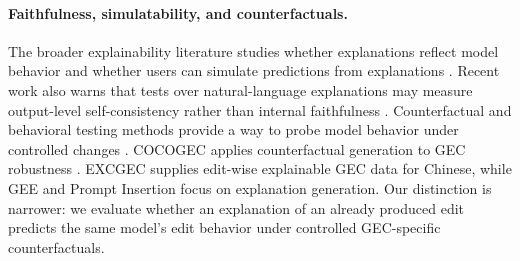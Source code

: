\paragraph{Faithfulness, simulatability, and counterfactuals.}
The broader explainability literature studies whether explanations reflect model behavior and whether users can simulate predictions from explanations \cite{hase-bansal-2020-evaluating,jacovi-goldberg-2020-towards,lyu-etal-2024-towards}. Recent work also warns that tests over natural-language explanations may measure output-level self-consistency rather than internal faithfulness \cite{parcalabescu-frank-2024-measuring}. Counterfactual and behavioral testing methods provide a way to probe model behavior under controlled changes \cite{ribeiro-etal-2020-beyond,gardner-etal-2020-evaluating,wu-etal-2021-polyjuice}. COCOGEC applies counterfactual generation to GEC robustness \cite{wang-etal-2026-cocogec}. EXCGEC supplies edit-wise explainable GEC data for Chinese, while GEE and Prompt Insertion focus on explanation generation. Our distinction is narrower: we evaluate whether an explanation of an already produced edit predicts the same model's edit behavior under controlled GEC-specific counterfactuals.
